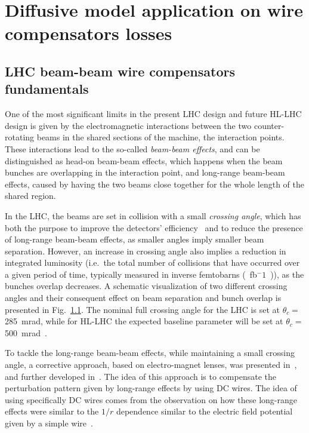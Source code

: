\chapter{Diffusive model application on wire compensators losses}

\section{LHC beam-beam wire compensators fundamentals}

One of the most significant limits in the present LHC design and future HL-LHC design is given by the electromagnetic interactions between the two counter-rotating beams in the shared sections of the machine, the interaction points. These interactions lead to the so-called \textit{beam-beam effects}, and can be distinguished as head-on beam-beam effects, which happens when the beam bunches are overlapping in the interaction point, and long-range beam-beam effects, caused by having the two beams close together for the whole length of the shared region.

In the LHC, the beams are set in collision with a small \textit{crossing angle}, which has both the purpose to improve the detectors' efficiency~\cite{} and to reduce the presence of long-range beam-beam effects, as smaller angles imply smaller beam separation. However, an increase in crossing angle also implies a reduction in integrated luminosity (i.e.\ the total number of collisions that have occurred over a given period of time, typically measured in inverse femtobarns (\SI{}{fb}$^-1$~\cite{})), as the bunches overlap decreases. A schematic visualization of two different crossing angles and their consequent effect on beam separation and bunch overlap is presented in Fig.~\ref{}. The nominal full crossing angle for the LHC is set at $\theta_c =$ \SI{285}{\milli\radian}, while for HL-LHC the expected baseline parameter will be set at $\theta_c =$ \SI{500}{\milli\radian}~\cite{}. 

\begin{figure}
    \centering
    \caption{}
    \label{fig:corssing-angles}
\end{figure}

To tackle the long-range beam-beam effects, while maintaining a small crossing angle, a corrective approach, based on electro-magnet lenses, was presented in~\cite{}, and further developed in~\cite{}. The idea of this approach is to compensate the perturbation pattern given by long-range effects by using DC wires. The idea of using specifically DC wires comes from the observation on how these long-range effects were similar to the $1/r$ dependence similar to the electric field potential given by a simple wire~\cite{}.

